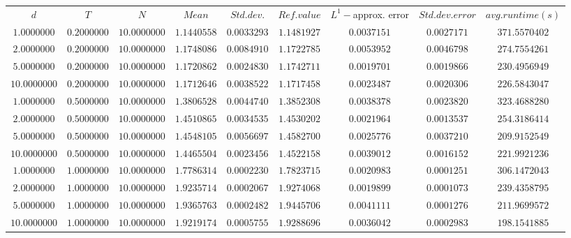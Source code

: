 \begin{tabular}{ccccccccc}
$d$ & $T$ & $N$ & $Mean$ & $Std. dev.$ & $Ref. value$ & $L^1-$approx. error & $Std. dev. error$ & $avg. runtime (s)$\\
$1.0000000$ & $0.2000000$ & $10.0000000$ & $1.1440558$ & $0.0033293$ & $1.1481927$ & $0.0037151$ & $0.0027171$ & $371.5570402$\\
$2.0000000$ & $0.2000000$ & $10.0000000$ & $1.1748086$ & $0.0084910$ & $1.1722785$ & $0.0053952$ & $0.0046798$ & $274.7554261$\\
$5.0000000$ & $0.2000000$ & $10.0000000$ & $1.1720862$ & $0.0024830$ & $1.1742711$ & $0.0019701$ & $0.0019866$ & $230.4956949$\\
$10.0000000$ & $0.2000000$ & $10.0000000$ & $1.1712646$ & $0.0038522$ & $1.1717458$ & $0.0023487$ & $0.0020306$ & $226.5843047$\\
$1.0000000$ & $0.5000000$ & $10.0000000$ & $1.3806528$ & $0.0044740$ & $1.3852308$ & $0.0038378$ & $0.0023820$ & $323.4688280$\\
$2.0000000$ & $0.5000000$ & $10.0000000$ & $1.4510865$ & $0.0034535$ & $1.4530202$ & $0.0021964$ & $0.0013537$ & $254.3186414$\\
$5.0000000$ & $0.5000000$ & $10.0000000$ & $1.4548105$ & $0.0056697$ & $1.4582700$ & $0.0025776$ & $0.0037210$ & $209.9152549$\\
$10.0000000$ & $0.5000000$ & $10.0000000$ & $1.4465504$ & $0.0023456$ & $1.4522158$ & $0.0039012$ & $0.0016152$ & $221.9921236$\\
$1.0000000$ & $1.0000000$ & $10.0000000$ & $1.7786314$ & $0.0002230$ & $1.7823715$ & $0.0020983$ & $0.0001251$ & $306.1472043$\\
$2.0000000$ & $1.0000000$ & $10.0000000$ & $1.9235714$ & $0.0002067$ & $1.9274068$ & $0.0019899$ & $0.0001073$ & $239.4358795$\\
$5.0000000$ & $1.0000000$ & $10.0000000$ & $1.9365763$ & $0.0002482$ & $1.9445706$ & $0.0041111$ & $0.0001276$ & $211.9699572$\\
$10.0000000$ & $1.0000000$ & $10.0000000$ & $1.9219174$ & $0.0005755$ & $1.9288696$ & $0.0036042$ & $0.0002983$ & $198.1541885$\\
\end{tabular}
